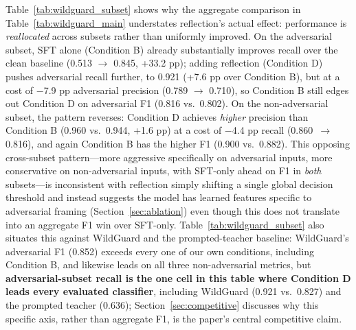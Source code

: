 \documentclass[superintelligence,article,accept,moreauthors]{Definitions/mdpi}
\begin{document}
Table~\ref{tab:wildguard_subset} shows why the aggregate comparison in Table~\ref{tab:wildguard_main} understates reflection's actual effect: performance is \emph{reallocated} across subsets rather than uniformly improved. On the adversarial subset, SFT alone (Condition B) already substantially improves recall over the clean baseline (0.513 $\to$ 0.845, +33.2 pp); adding reflection (Condition D) pushes adversarial recall further, to 0.921 (+7.6 pp over Condition B), but at a cost of $-$7.9 pp adversarial precision (0.789 $\to$ 0.710), so Condition B still edges out Condition D on adversarial F1 (0.816 vs.\ 0.802). On the non-adversarial subset, the pattern reverses: Condition D achieves \emph{higher} precision than Condition B (0.960 vs.\ 0.944, +1.6 pp) at a cost of $-$4.4 pp recall (0.860~$\to$ 0.816), and again Condition B has the higher F1 (0.900 vs.\ 0.882). This opposing cross-subset pattern---more aggressive specifically on adversarial inputs, more conservative on non-adversarial inputs, with SFT-only ahead on F1 in \emph{both} subsets---is inconsistent with reflection simply shifting a single global decision threshold and instead suggests the model has learned features specific to adversarial framing (Section~\ref{sec:ablation}) even though this does not translate into an aggregate F1 win over SFT-only. Table~\ref{tab:wildguard_subset} also situates this against WildGuard and the prompted-teacher baseline: WildGuard's adversarial F1 (0.852) exceeds every one of our own conditions, including Condition B, and likewise leads on all three non-adversarial metrics, but \textbf{adversarial-subset recall is the one cell in this table where Condition D leads every evaluated classifier}, including WildGuard (0.921 vs.\ 0.827) and the prompted teacher (0.636); Section~\ref{sec:competitive} discusses why this specific axis, rather than aggregate F1, is the paper's central competitive claim.
\end{document}
